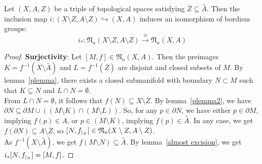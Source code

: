 \documentclass[a4paper,12pt]{article}
\begin{document}
\begin{lemma}\label{excision}
    Let \((X,A,Z)\) be a triple of topological spaces satisfying \(\overline{Z}\subseteq\overset{\circ}{A}\). Then the inclusion map \(i:(X\setminus Z,A\setminus Z)\hookrightarrow(X,A)\) induces an isomorphism of bordism groups:
    \[i_\ast:\mathfrak{N}_n(X\setminus Z,A\setminus Z)\xrightarrow{\cong}\mathfrak{N}_n(X,A)\]
\end{lemma}

\begin{proof}\cite{zhang}
    \textbf{Surjectivity}: Let \([M,f]\in\mathfrak{N}_n(X,A)\). Then the preimages \(K=f^{-1}(X\setminus\overset{\circ}A)\) and \(L=f^{-1}(\overline{Z})\) are disjoint and closed subsets of \(M\). By lemma\ \ref{plemma}, there exists a closed submanifold with boundary \(N\subset M\) such that \(K\subseteq N\) and \(L\cap N=\emptyset\).\\
    From \(L\cap N=\emptyset\), it follows that \(f(N)\subseteq X\setminus\overline{Z}\). By lemma\ \ref{plemma2}, we have \(\partial N\subseteq \partial M\cup((M\setminus K)\cap(M\setminus L))\). So, for any \(p\in \partial N\), we have either \(p\in\partial M\), implying \(f(p)\in A\), or \(p\in(M\setminus K)\), implying \(f(p)\in\overset{\circ}A\). In any case, we get \(f(\partial N)\subseteq A\setminus\overline{Z}\), so \([N, f_{|_{N}}]\in\mathfrak{N}_n(X\setminus Z,A\setminus Z)\).\\
    As \(f^{-1}(X\setminus\overset{\circ}A)\), we get \(f(M\setminus N)\subseteq \overset{\circ}A\). By lemma\ \ref{almost excision}, we get \(i_\ast[N,f_{|_{N}}]=[M,f]\).


\end{proof}
\end{document}
